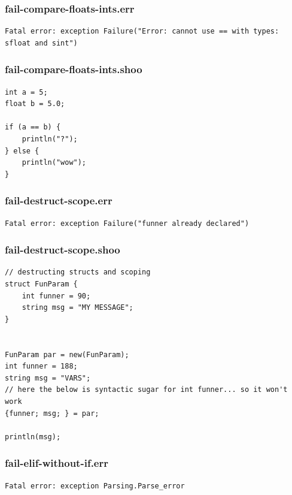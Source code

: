 \documentclass[12pt]{article}
\begin{document}
\subsubsection{fail-compare-floats-ints.err}
\begin{mdframed}[hidealllines=true,backgroundcolor=green!10]
\begin{lstlisting}
Fatal error: exception Failure("Error: cannot use == with types: sfloat and sint")
\end{lstlisting}
\end{mdframed}
\subsubsection{fail-compare-floats-ints.shoo}
\begin{mdframed}[hidealllines=true,backgroundcolor=blue!10]
\begin{lstlisting}
int a = 5;
float b = 5.0;

if (a == b) {
    println("?");
} else {
    println("wow");
}
\end{lstlisting}
\end{mdframed}
\subsubsection{fail-destruct-scope.err}
\begin{mdframed}[hidealllines=true,backgroundcolor=green!10]
\begin{lstlisting}
Fatal error: exception Failure("funner already declared")\end{lstlisting}
\end{mdframed}
\subsubsection{fail-destruct-scope.shoo}
\begin{mdframed}[hidealllines=true,backgroundcolor=blue!10]
\begin{lstlisting}
// destructing structs and scoping
struct FunParam {
	int funner = 90;
	string msg = "MY MESSAGE";
}


FunParam par = new(FunParam);
int funner = 188;
string msg = "VARS";
// here the below is syntactic sugar for int funner... so it won't work
{funner; msg; } = par;

println(msg);\end{lstlisting}
\end{mdframed}
\subsubsection{fail-elif-without-if.err}
\begin{mdframed}[hidealllines=true,backgroundcolor=green!10]
\begin{lstlisting}
Fatal error: exception Parsing.Parse_error
\end{lstlisting}
\end{mdframed}
\end{document}
